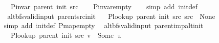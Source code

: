 \begin{isabellebody}
\ \ \ {\isachardoublequoteopen}P{\isacharunderscore}{\kern0pt}invar\ {\isacharparenleft}{\kern0pt}parent\ {\isacharparenleft}{\kern0pt}init\ src{\isacharparenright}{\kern0pt}{\isacharparenright}{\kern0pt}{\isachardoublequoteclose}%
\endisataginvisible
{\isafoldinvisible}%
%
\isadeliminvisible
\isanewline
%
\endisadeliminvisible
%
\isadelimproof
\ \ %
\endisadelimproof
%
\isatagproof
{}\isamarkupfalse%
\ P{\isachardot}{\kern0pt}invar{\isacharunderscore}{\kern0pt}empty\isanewline
\ \ \isamarkupfalse%
\ {\isacharparenleft}{\kern0pt}simp\ add{\isacharcolon}{\kern0pt}\ init{\isacharunderscore}{\kern0pt}def{\isacharparenright}{\kern0pt}%
\endisatagproof
{\isafoldproof}%
%
\isadelimproof
\isanewline
%
\endisadelimproof
%
\isadeliminvisible
\isanewline
%
\endisadeliminvisible
%
\isataginvisible
{}\isamarkupfalse%
\ {\isacharparenleft}{\kern0pt}\ alt{\isacharunderscore}{\kern0pt}bfs{\isacharunderscore}{\kern0pt}valid{\isacharunderscore}{\kern0pt}input{\isacharparenright}{\kern0pt}\ parent{\isacharunderscore}{\kern0pt}src{\isacharunderscore}{\kern0pt}init{\isacharcolon}{\kern0pt}\isanewline
\ \ \ {\isachardoublequoteopen}P{\isacharunderscore}{\kern0pt}lookup\ {\isacharparenleft}{\kern0pt}parent\ {\isacharparenleft}{\kern0pt}init\ src{\isacharparenright}{\kern0pt}{\isacharparenright}{\kern0pt}\ src\ {\isacharequal}{\kern0pt}\ None{\isachardoublequoteclose}%
\endisataginvisible
{\isafoldinvisible}%
%
\isadeliminvisible
\isanewline
%
\endisadeliminvisible
%
\isadelimproof
\ \ %
\endisadelimproof
%
\isatagproof
{}\isamarkupfalse%
\ {\isacharparenleft}{\kern0pt}simp\ add{\isacharcolon}{\kern0pt}\ init{\isacharunderscore}{\kern0pt}def\ P{\isachardot}{\kern0pt}map{\isacharunderscore}{\kern0pt}empty{\isacharparenright}{\kern0pt}%
\endisatagproof
{\isafoldproof}%
%
\isadelimproof
\isanewline
%
\endisadelimproof
%
\isadeliminvisible
\isanewline
%
\endisadeliminvisible
%
\isataginvisible
{}\isamarkupfalse%
\ {\isacharparenleft}{\kern0pt}\ alt{\isacharunderscore}{\kern0pt}bfs{\isacharunderscore}{\kern0pt}valid{\isacharunderscore}{\kern0pt}input{\isacharparenright}{\kern0pt}\ parent{\isacharunderscore}{\kern0pt}imp{\isacharunderscore}{\kern0pt}alt{\isacharunderscore}{\kern0pt}init{\isacharcolon}{\kern0pt}\isanewline
\ \ \ {\isachardoublequoteopen}P{\isacharunderscore}{\kern0pt}lookup\ {\isacharparenleft}{\kern0pt}parent\ {\isacharparenleft}{\kern0pt}init\ src{\isacharparenright}{\kern0pt}{\isacharparenright}{\kern0pt}\ v\ {\isacharequal}{\kern0pt}\ Some\ u{\isachardoublequoteclose}\isanewline

\end{isabellebody}
